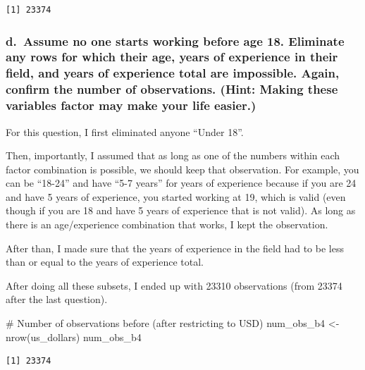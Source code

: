 \documentclass[
  letterpaper,
  DIV=11,
  numbers=noendperiod]{scrartcl}
\newenvironment{Shaded}{\begin{snugshade}}{\end{snugshade}}
\newcommand{\CommentTok}[1]{\textcolor[rgb]{0.37,0.37,0.37}{#1}}
\newcommand{\FunctionTok}[1]{\textcolor[rgb]{0.28,0.35,0.67}{#1}}
\newcommand{\NormalTok}[1]{\textcolor[rgb]{0.00,0.23,0.31}{#1}}
\newcommand{\OtherTok}[1]{\textcolor[rgb]{0.00,0.23,0.31}{#1}}
\begin{document}
\begin{verbatim}
[1] 23374
\end{verbatim}

\subsubsection{d.~Assume no one starts working before age 18. Eliminate
any rows for which their age, years of experience in their field, and
years of experience total are impossible. Again, confirm the number of
observations. (Hint: Making these variables factor may make your life
easier.)}\label{d.-assume-no-one-starts-working-before-age-18.-eliminate-any-rows-for-which-their-age-years-of-experience-in-their-field-and-years-of-experience-total-are-impossible.-again-confirm-the-number-of-observations.-hint-making-these-variables-factor-may-make-your-life-easier.}

For this question, I first eliminated anyone ``Under 18''.

Then, importantly, I assumed that as long as one of the numbers within
each factor combination is possible, we should keep that observation.
For example, you can be ``18-24'' and have ``5-7 years'' for years of
experience because if you are 24 and have 5 years of experience, you
started working at 19, which is valid (even though if you are 18 and
have 5 years of experience that is not valid). As long as there is an
age/experience combination that works, I kept the observation.

After than, I made sure that the years of experience in the field had to
be less than or equal to the years of experience total.

After doing all these subsets, I ended up with 23310 observations (from
23374 after the last question).

\begin{Shaded}
\begin{Highlighting}[]
\CommentTok{\# Number of observations before (after restricting to USD)}
\NormalTok{num\_obs\_b4 }\OtherTok{\textless{}{-}} \FunctionTok{nrow}\NormalTok{(us\_dollars)}
\NormalTok{num\_obs\_b4}
\end{Highlighting}
\end{Shaded}

\begin{verbatim}
[1] 23374
\end{verbatim}
\end{document}
